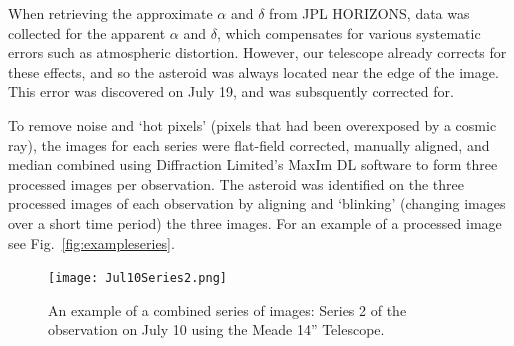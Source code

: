 \documentclass[12pt,journal,compsoc]{IEEEtran}
\begin{document}
When retrieving the approximate $\alpha$ and $\delta$ from JPL HORIZONS, 
data was collected for the apparent $\alpha$ and $\delta$, which compensates for various systematic errors such as atmospheric distortion.
However, our telescope already corrects for these effects, and so the asteroid was always located near the edge of the image. 
This error was discovered on July 19, and was subsquently corrected for.

To remove noise and `hot pixels' (pixels that had been overexposed by a cosmic ray), 
the images for each series were flat-field corrected, manually aligned, and median combined 
using Diffraction Limited's MaxIm DL software to form three processed images per observation.
The asteroid was identified on the three processed images of each observation 
by aligning and `blinking' (changing images over a short time period) the three images.
For an example of a processed image see Fig.~\ref{fig:exampleseries}.

\begin{figure}[!t]
\centering
\texttt{[image: Jul10Series2.png]}
\caption{An example of a combined series of images: Series 2 of the observation on July 10 using the Meade 14'' Telescope.\label{fig:exampleseries}}
\label{fig_sim}
\end{figure}
\end{document}
